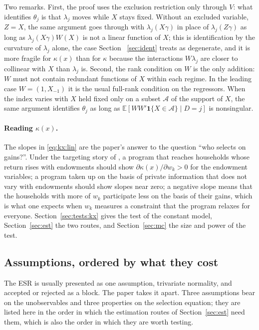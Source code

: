 \documentclass[11pt,a4paper]{article}
\theoremstyle{plain}
\theoremstyle{definition}
\theoremstyle{remark}
\newcommand{\E}{\mathbb{E}}
\newcommand{\1}{\mathbf{1}}
\newcommand{\kX}{\kappa(x)}
\begin{document}
Two remarks. First, the proof uses the exclusion restriction only through
$V$: what identifies $\theta_j$ is that $\lambda_j$ moves while $X$ stays
fixed. Without an excluded variable, $Z=X$, the same argument goes through
with $\lambda_j(X\gamma)$ in place of $\lambda_j(Z\gamma)$ as long as
$\lambda_j(X\gamma)W(X)$ is not a linear function of $X$; this is
identification by the curvature of $\lambda_j$ alone, the case Section~%
\ref{sec:ident} treats as degenerate, and it is more fragile for $\kX$ than
for $\kappa$ because the interactions $W\lambda_j$ are closer to collinear
with $X$ than $\lambda_j$ is. Second, the rank condition on $W$ is the only
addition: $W$ must not contain redundant functions of $X$ within each
regime. In the leading case $W=(1,X_{-1})$ it is the usual full-rank
condition on the regressors. When the index varies with $X$ held fixed
only on a subset $\mathcal A$ of the support of $X$, the same argument
identifies $\theta_j$ as long as $\E[WW'\1\{X\in\mathcal A\}\mid D=j]$ is
nonsingular.

\paragraph{Reading $\kX$.}
The slopes in \eqref{eq:kx:lin} are the paper's answer to the question
``who selects on gains?''. Under the targeting story of
\citet{araar2026sog}, a program that reaches households whose return rises
with endowments should show $\partial\kX/\partial w_k>0$ for the endowment
variables; a program taken up on the basis of private information that does
not vary with endowments should show slopes near zero; a negative slope
means that the households with more of $w_k$ participate less on the basis
of their gains, which is what one expects when $w_k$ measures a constraint
that the program relaxes for everyone. Section~\ref{sec:tests:kx} gives the
test of the constant model, Section~\ref{sec:est} the two routes, and
Section~\ref{sec:mc} the size and power of the test.

\subsection{Assumptions, ordered by what they cost}\label{sec:model:assump}

The ESR is usually presented as one assumption, trivariate normality, and
accepted or rejected as a block. The paper takes it apart. Three
assumptions bear on the unobservables and three properties on the
selection equation; they are listed here in the order in which the
estimation routes of Section~\ref{sec:est} need them, which is also the
order in which they are worth testing.
\end{document}
